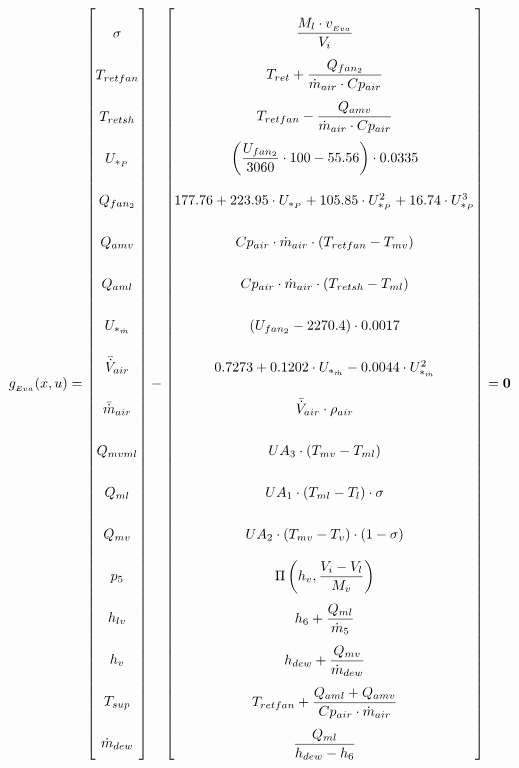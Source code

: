 \begin{equation} \label{eq:Gevaporator}\renewcommand{\arraystretch}{2.5}
	g_{_{Eva}}(x,u) =  \begin{bmatrix}
		\sigma		\\
		T_{retfan}	\\
		T_{retsh}	\\
		U_{*_P}	\\
		Q_{fan_2}		\\
		Q_{amv}		\\
		Q_{aml}		\\
		U_{*_{\dot{m}}}	\\
		\bar{\dot{V}}_{air}		\\
		\bar{\dot{m}}_{air}		\\
		Q_{mvml}	\\
		Q_{ml}		\\
		Q_{mv}		\\
		p_{5}		\\
		h_{lv}			\\
		h_v 		\\
		T_{sup}		\\
		\dot{m}_{dew}\\
	\end{bmatrix}
	-
	\begin{bmatrix}
		\dfrac{M_l \cdot v_{_{Eva}}}{V_i}							\\
		T_{ret} + \dfrac{Q_{fan_2}}{\dot{m}_{air} \cdot Cp_{air}}			\\
		T_{retfan} - \dfrac{Q_{amv}}{\dot{m}_{air} \cdot Cp_{air}}		\\
		\left( \dfrac{U_{fan_2}}{3060}\cdot 100 - 55.56 \right) \cdot 0.0335 \\
		177.76 + 223.95 \cdot U_{*_P} + 105.85 \cdot U_{*_P}^2 + 16.74 \cdot U_{*_P}^3 \\
		Cp_{air} \cdot \dot{m}_{air} \cdot (T_{retfan} - T_{mv}) 	 \\
		Cp_{air} \cdot \dot{m}_{air} \cdot (T_{retsh} - T_{ml}) \\
		(U_{fan_2} - 2270.4)\cdot 0.0017 \\
		0.7273 + 0.1202 \cdot 	U_{*_{\dot{m}}}  -0.0044 \cdot	U_{*_{\dot{m}}}^2\\
		\bar{\dot{V}}_{air} \cdot \rho_{air}	\\
		U A_3 \cdot (T_{mv} - T_{ml})	\\
		U A_1 \cdot (T_{ml} - T_l) \cdot \sigma	\\
		U A_2 \cdot (T_{mv} - T_v) \cdot (1- \sigma)	\\
		\Pi \left( h_v, \dfrac{V_i-V_l}{M_v} \right)		\\
		h_{6} + \dfrac{Q_{ml}}{\dot{m}_{5}}			\\
		h_{dew} + \dfrac{Q_{mv}}{\dot{m}_{dew}}   		\\
		T_{retfan} +  \dfrac{Q_{aml} + Q_{amv}}{Cp_{air} \cdot \dot{m}_{air}} \\
		\dfrac{Q_{ml}}{h_{dew} - h_{6}}		\\
	\end{bmatrix}
	=\textbf{0}
\end{equation}



